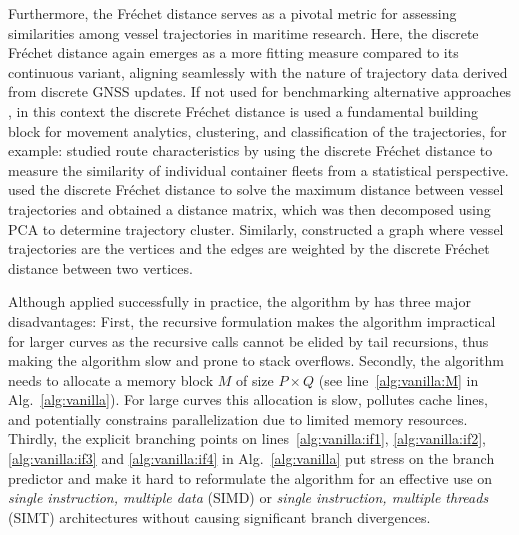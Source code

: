 Furthermore, the Fr\'echet distance serves as a pivotal metric for assessing similarities among vessel trajectories in maritime research.
Here, the discrete Fr\'echet distance again emerges as a more fitting measure compared to its continuous variant, aligning seamlessly with the nature of trajectory data derived from discrete GNSS updates.
If not used for benchmarking alternative approaches \citep{li20,liu23,luo23}, in this context the discrete Fr\'echet distance is used a fundamental building block for movement analytics, clustering, and classification of the trajectories, for example:
\citet{sakan23} studied route characteristics by using the discrete Fr\'{e}chet distance to measure the similarity of individual container fleets from a statistical perspective.
\citet{cao18} used the discrete Fr\'{e}chet distance to solve the maximum distance between vessel trajectories and obtained a distance matrix, which was then decomposed using PCA to determine trajectory cluster.
Similarly, \citet{roberts18} constructed a graph where vessel trajectories are the vertices and the edges are weighted by the discrete Fr\'echet distance between two vertices.

Although applied successfully in practice, the algorithm by \citet{eiter94} has three major disadvantages:
First, the recursive formulation makes the algorithm impractical for larger curves as the recursive calls cannot be elided by tail recursions, thus making the algorithm slow and prone to stack overflows.
Secondly, the algorithm needs to allocate a memory block $M$ of size $P \times Q$ (see line~\ref{alg:vanilla:M} in Alg.~\ref{alg:vanilla}).
For large curves this allocation is slow, pollutes cache lines, and potentially constrains parallelization due to limited memory resources.
Thirdly, the explicit branching points on lines~\ref{alg:vanilla:if1}, \ref{alg:vanilla:if2}, \ref{alg:vanilla:if3} and \ref{alg:vanilla:if4} in Alg.~\ref{alg:vanilla} put stress on the branch predictor and make it hard to reformulate the algorithm for an effective use on \textit{single instruction, multiple data} (SIMD) or \textit{single instruction, multiple threads} (SIMT) architectures \citep{flynn72} without causing significant branch divergences.

